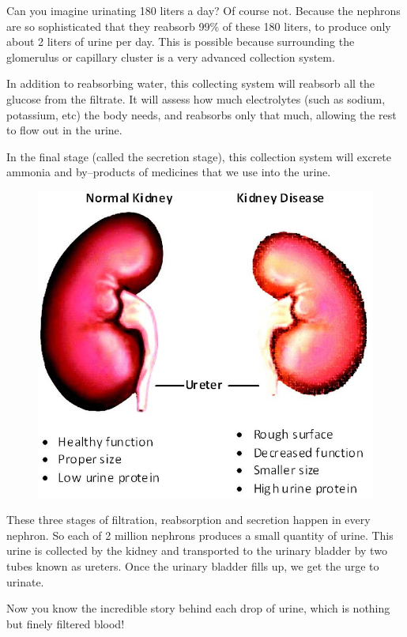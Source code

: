 Can you imagine urinating 180 liters a day? Of course not. Because the nephrons are so sophisticated that they reabsorb 99\% of these 180 liters, to produce only about 2 liters of urine per day. This is possible because surrounding the glomerulus or capillary cluster is a very advanced collection system.

In addition to reabsorbing water, this collecting system will reabsorb all the glucose from the filtrate. It will assess how much electrolytes (such as sodium, potassium, etc) the body needs, and reabsorbs only that much, allowing the rest to flow out in the urine.

In the final stage (called the secretion stage), this collection system will excrete ammonia and by–products of medicines that we use into the urine.

\begin{figure}
\includegraphics{images/047.jpg}
\end{figure}

These three stages of filtration, reabsorption and secretion happen in every nephron. So each of 2 million nephrons produces a small quantity of urine. This urine is collected by the kidney and transported to the urinary bladder by two tubes known as ureters. Once the urinary bladder fills up, we get the urge to urinate.

Now you know the incredible story behind each drop of urine, which is nothing but finely filtered blood!

